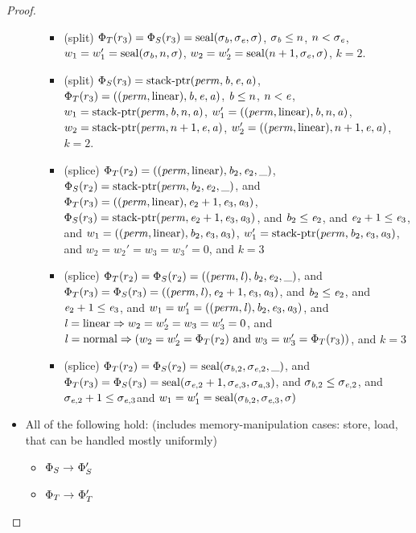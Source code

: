 \documentclass[a4paper]{article}
\begin{document}
\begin{proof}
\begin{itemize}
\begin{itemize}
\begin{itemize}
    \item (split) $\Phi_T(r_3) = \Phi_S(r_3) = \mathrm{seal}(\sigma_{\mathit{b}},\sigma_{\mathit{e}},\sigma)$, $\sigma_{\mathit{b}} \leq n$, $n < \sigma_{\mathit{e}}$, $w_1 = w_1' = \mathrm{seal}(\sigma_{\mathit{b}},n,\sigma)$, $w_2 = w_2' = \mathrm{seal}(n+1,\sigma_{\mathit{e}},\sigma)$, $k=2$.
    \item (split) $\Phi_S(r_3) = \mathrm{stack\text{-}ptr}(\mathit{perm},\mathit{b},\mathit{e},\mathit{a})$, $\Phi_T(r_3) = ((\mathit{perm},\mathrm{linear}),\mathit{b},\mathit{e},\mathit{a})$, $\mathit{b} \leq n$, $n < \mathit{e}$, $w_1 = \mathrm{stack\text{-}ptr}(\mathit{perm},\mathit{b},n,\mathit{a})$, $w_1' = ((\mathit{perm},\mathrm{linear}),\mathit{b},n,\mathit{a})$, $w_2 = \mathrm{stack\text{-}ptr}(\mathit{perm},n+1,\mathit{e},\mathit{a})$, $w_2' = ((\mathit{perm},\mathrm{linear}),n+1,\mathit{e},\mathit{a})$, $k=2$.
    \item (splice) $\Phi_T(r_2) = ((\mathit{perm},\mathrm{linear}),\mathit{b}_2,\mathit{e}_2,\_)$,
      $\Phi_S(r_2) = \mathrm{stack\text{-}ptr}(\mathit{perm},\mathit{b}_2,\mathit{e}_2,\_)$, and
      $\Phi_T(r_3) = ((\mathit{perm},\mathrm{linear}),\mathit{e}_2+1,\mathit{e}_3,\mathit{a}_3)$,
      $\Phi_S(r_3) = \mathrm{stack\text{-}ptr}(\mathit{perm},\mathit{e}_2+1,\mathit{e}_3,\mathit{a}_3)$, and
      $\mathit{b}_2 \leq \mathit{e}_2$, and
      $\mathit{e}_2+1 \leq \mathit{e}_3$, and
      $w_1=((\mathit{perm},\mathrm{linear}),\mathit{b}_2,\mathit{e}_3,\mathit{a}_3)$, $w_1'=
      \mathrm{stack\text{-}ptr}(\mathit{perm},\mathit{b}_2,\mathit{e}_3,\mathit{a}_3)$, and
      $w_2 = w_2' = w_3 = w_3' = 0$, and
      $k=3$
    \item (splice) $\Phi_T(r_2) = \Phi_S(r_2) =
      ((\mathit{perm},\mathit{l}),\mathit{b}_2,\mathit{e}_2,\_)$, and
      $\Phi_T(r_3) = \Phi_S(r_3) = ((\mathit{perm},\mathit{l}),\mathit{e}_2+1,\mathit{e}_3,\mathit{a}_3)$,
      and
      $\mathit{b}_2 \leq \mathit{e}_2$, and $\mathit{e}_2+1 \leq \mathit{e}_3$, and
      $w_1=w_1'=((\mathit{perm},\mathit{l}),\mathit{b}_2,\mathit{e}_3,\mathit{a}_3)$, and
      $\mathit{l} = \mathrm{linear} \Rightarrow w_2 = w_2' = w_3 = w_3' = 0$, and
      $\mathit{l} = \mathrm{normal} \Rightarrow (w_2 = w_2' = \Phi_T(r_2) \text{ and } w_3 =
      w_3' = \Phi_T(r_3))$, and $k=3$
    \item (splice) $\Phi_T(r_2) = \Phi_S(r_2) = \mathrm{seal}(\sigma_{\mathit{b},2},\sigma_{\mathit{e},2},\_)$, and $\Phi_T(r_3) = \Phi_S(r_3) = \mathrm{seal}(\sigma_{\mathit{e},2}+1,\sigma_{\mathit{e},3},\sigma_{\mathit{a},3})$, and $\sigma_{\mathit{b},2} \leq \sigma_{\mathit{e},2}$, and $\sigma_{\mathit{e},2} + 1 \leq \sigma_{\mathit{e},3}$and $w_1 = w_1' = \mathrm{seal}(\sigma_{\mathit{b},2}, \sigma_{\mathit{e},3}, \sigma)$
      \end{itemize}
  \end{itemize}
\item All of the following hold: (includes memory-manipulation cases: store, load, that can be handled mostly uniformly)
  \begin{itemize}
  \item $\Phi_S \rightarrow^{} \Phi_S'$
  \item $\Phi_T \rightarrow^{} \Phi_T'$

\end{itemize}
\end{itemize}
\end{proof}
\end{document}
